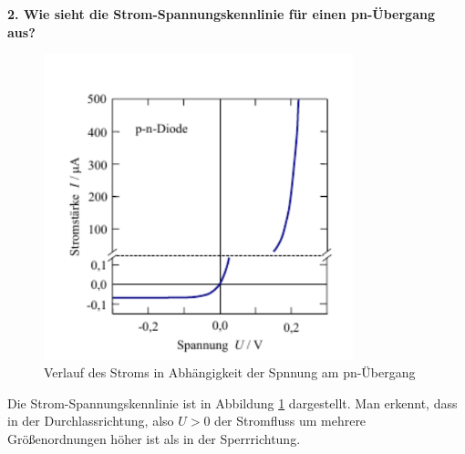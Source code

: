 \noindent\textbf{2. Wie sieht die Strom-Spannungskennlinie für einen pn-Übergang aus?}\\
\begin{addmargin}[25pt]{0pt}
\begin{figure}[h]
    \centering
    \includegraphics[width = 0.8\textwidth]{images/KM2/pn_transition_Strom_Spannung.png}
    \caption{Verlauf des Stroms in Abhängigkeit der Spnnung am pn-Übergang}
    \label{fig:pn_transition_Strom_Spannung}
\end{figure} 
Die Strom-Spannungskennlinie ist in Abbildung \ref{fig:pn_transition_Strom_Spannung} dargestellt. Man erkennt, dass in der Durchlassrichtung, also $U>0$ der Stromfluss um mehrere Größenordnungen höher ist als in der Sperrrichtung.\\
 \end{addmargin}


